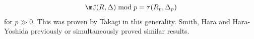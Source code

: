 \documentclass[12pt]{amsart}
\numberwithin{equation}{theorem}
\renewcommand{\:}{\colon}
\theoremstyle{theorem}
\begin{document}
\begin{enumerate}[label=(\arabic*)]
    \[
        \mJ(R, \Delta) \;\mathrm{mod}\; p = \tau(R_p, \Delta_p)
    \]
    for $p \gg 0$.  This was proven by Takagi in this generality.  Smith, Hara and Hara-Yoshida previously or simultaneously proved similar results.
\end{enumerate}
\end{document}
